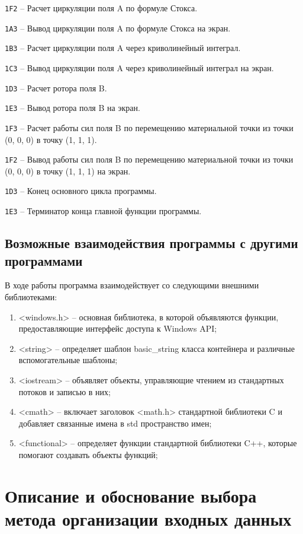 \documentclass[14pt,a4paper,final]{extreport}
\begin{document}
\texttt{1F2} --  Расчет циркуляции поля A по формуле Стокса.

\texttt{1A3} -- Вывод циркуляции поля A по формуле Стокса на экран.

\texttt{1B3} --  Расчет циркуляции поля A через криволинейный интеграл.

\texttt{1C3} -- Вывод циркуляции поля A через криволинейный интеграл на экран.

\texttt{1D3} --  Расчет ротора поля B.

\texttt{1E3} -- Вывод ротора поля B на экран.

\texttt{1F3} --  Расчет работы сил поля B по перемещению материальной точки из точки (0, 0, 0) в точку (1, 1, 1).

\texttt{1F2} -- Вывод работы сил поля B по перемещению материальной точки из точки (0, 0, 0) в точку (1, 1, 1) на экран.

\texttt{1D3} -- Конец основного цикла программы.

\texttt{1E3} -- Терминатор конца главной функции программы.

\pagebreak

\subsection{Возможные взаимодействия программы с другими программами}

В ходе работы программа взаимодействует со следующими внешними библиотеками:
\begin{enumerate}[itemindent=\parindent]
\item <windows.h> -- основная библиотека, в которой объявляются функции, предоставляющие интерфейс доступа к Windows API;
	\item <string> -- определяет шаблон basic\_string класса контейнера и различные вспомогательные шаблоны;
	\item <iostream> -- объявляет объекты, управляющие чтением из стандартных потоков и записью в них;
	\item <cmath> -- включает заголовок <math.h> стандартной библиотеки C и добавляет связанные имена в std пространство имен;
	\item <functional> -- определяет функции стандартной библиотеки C++, которые помогают создавать объекты функций;
\end{enumerate}

\section{Описание и обоснование выбора метода организации входных данных}
\end{document}
